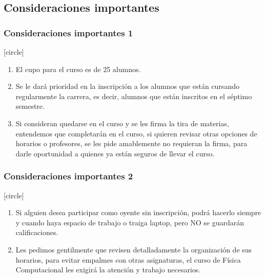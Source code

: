 \documentclass[12pt]{beamer}
\newcounter{saveenumi}
\newcommand{\seti}{\setcounter{saveenumi}{\value{enumi}}}
\newcommand{\conti}{\setcounter{enumi}{\value{saveenumi}}}
\begin{document}
\subsection{Consideraciones importantes}
\begin{frame}
\frametitle{Consideraciones importantes 1}
\fontsize{12}{12}
[circle]
\begin{enumerate}[<+->]
\item El cupo para el curso es de 25 alumnos.
\item Se le dará prioridad en la inscripción a los alumnos que están cursando regularmente la carrera, es decir, alumnos que están inscritos en el séptimo semestre.
\item Si consideran quedarse en el curso y se les firma la tira de materias, entendemos que completarán en el curso, si quieren revisar otras opciones de horarios o profesores, se les pide amablemente no requieran la firma, para darle oportunidad a quienes ya están seguros de llevar el curso.
\seti
\end{enumerate}
\end{frame}
\begin{frame}
\frametitle{Consideraciones importantes 2}
\fontsize{12}{12}
[circle]
\begin{enumerate}[<+->]
\conti
\item Si alguien desea participar como oyente sin inscripción, podrá hacerlo siempre y cuando haya espacio de trabajo o traiga laptop, pero NO se guardarán calificaciones.
\item Les pedimos gentilmente que revisen detalladamente la organización de sus horarios, para evitar empalmes con otras asignaturas, el curso de Física Computacional les exigirá la atención y trabajo necesarios.
\end{enumerate}
\end{frame}
\end{document}
